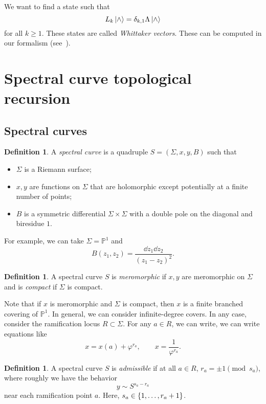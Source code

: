 \documentclass{amsart}
\theoremstyle{definition}
\newtheorem{defn}[thm]{Definition}
\theoremstyle{remark}
\theoremstyle{plain}
\theoremstyle{definition}
\theoremstyle{remark}
\renewcommand{\P}{\mathbb{P}}
\newcommand{\1}{\mathbf{1}}
\newcommand{\2}{\mathbf{2}}
\newcommand{\3}{\mathbf{3}}
\begin{document}
We want to find a state such that
\[ L_k \ket{\wedge} = \delta_{k, 1} \Lambda \ket{\wedge} \]
for all $k \geq 1$. These states are called \textit{Whittaker vectors}. These can be computed in our formalism (see~\cite{whittakervectoprec}).


\section{Spectral curve topological recursion}

\subsection{Spectral curves}

\begin{defn}
    A \textit{spectral curve} is a quadruple $S = (\Sigma, x, y, B)$ such that
    \begin{itemize}
        \item $\Sigma$ is a Riemann surface;
        \item $x, y$ are functions on $\Sigma$ that are holomorphic except potentially at a finite number of points;
        \item $B$ is a symmetric differential $\Sigma \times \Sigma$ with a double pole on the diagonal and biresidue $1$.
    \end{itemize}
\end{defn}

For example, we can take $\Sigma = \P^1$ and
\[ B(z_1, z_2) = \frac{\dd{z_1} \dd{z_2}}{(z_1-z_2)^2}. \]

\begin{defn}
    A spectral curve $S$ is \textit{meromorphic} if $x, y$ are meromorphic on $\Sigma$ and is \textit{compact} if $\Sigma$ is compact.
\end{defn}

Note that if $x$ is meromorphic and $\Sigma$ is compact, then $x$ is a finite branched covering of $\P^1$. In general, we can consider infinite-degree covers. In any case, consider the ramification locus $R \subset \Sigma$. For any $a \in R$, we can write, we can write equations like
\[ x = x(a) + \varphi^{r_a}, \qquad x = \frac{1}{\varphi^{r_a}}. \]

\begin{defn}
    A spectral curve $S$ is \textit{admissible} if at all $a \in R$, $r_a = \pm 1 \pmod{s_a}$, where roughly we have the behavior
    \[ y \sim S^{s_a-r_a} \]
    near each ramification point $a$. Here, $s_a \in \qty{1, \ldots, r_a+1}$.
\end{defn}
\end{document}
